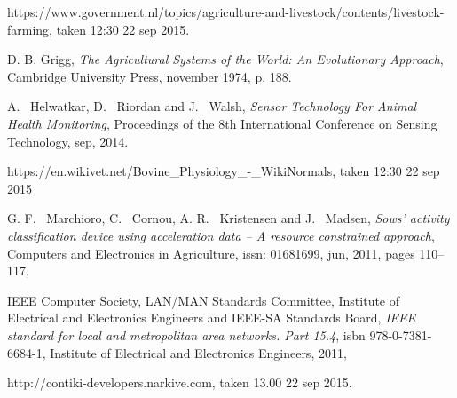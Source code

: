 \documentclass[conference]{IEEEtran}
\begin{document}
%
%
%
\begin{thebibliography}{1}

https://www.government.nl/topics/agriculture-and-livestock/contents/livestock-farming, taken 12:30 22 sep 2015.

D. B. Grigg, \emph{The Agricultural Systems of
the World: An Evolutionary Approach}, Cambridge University Press, november
1974, p. 188.

A. ~Helwatkar, D. ~Riordan and J. ~Walsh,
\emph{Sensor Technology For Animal Health Monitoring},
Proceedings of the 8th International Conference on Sensing Technology,
sep, 2014.

https://en.wikivet.net/Bovine\_Physiology\_-\_WikiNormals, taken 12:30 22 sep
2015 

G. F. ~Marchioro, C. ~Cornou, A. R. ~Kristensen and J. ~Madsen,
\emph{Sows’ activity classification device using acceleration data – A resource constrained approach},
Computers and Electronics in Agriculture,
issn: 01681699,
jun,
2011,
pages 110--117,

IEEE Computer Society, LAN/MAN Standards Committee, Institute of Electrical
and Electronics Engineers and IEEE-SA Standards Board, \emph{IEEE standard
for local and metropolitan area networks. Part 15.4}, isbn
978-0-7381-6684-1, Institute of Electrical and Electronics Engineers, 2011,

    
http://contiki-developers.narkive.com, taken 13.00 22 sep 2015.


\end{thebibliography}


\end{document}
